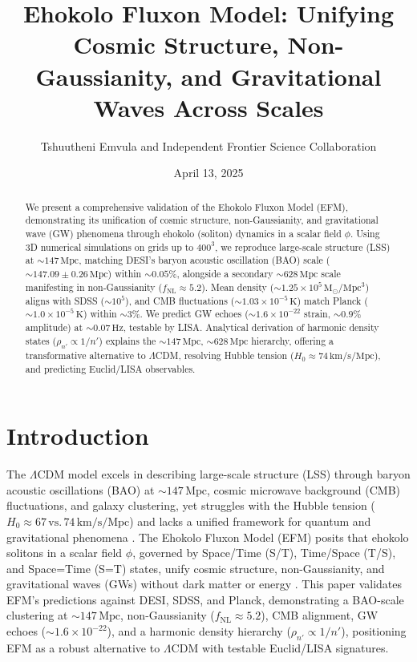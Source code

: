 \documentclass{article}
\title{Ehokolo Fluxon Model: Unifying Cosmic Structure, Non-Gaussianity, and Gravitational Waves Across Scales}
\author{Tshuutheni Emvula and Independent Frontier Science Collaboration}
\date{April 13, 2025}
\begin{document}
\maketitle

\begin{abstract}
We present a comprehensive validation of the Ehokolo Fluxon Model (EFM), demonstrating its unification of cosmic structure, non-Gaussianity, and gravitational wave (GW) phenomena through ehokolo (soliton) dynamics in a scalar field \(\phi\). Using 3D numerical simulations on grids up to \(400^3\), we reproduce large-scale structure (LSS) at \(\sim 147 \, \text{Mpc}\), matching DESI’s baryon acoustic oscillation (BAO) scale (\(\sim 147.09 \pm 0.26 \, \text{Mpc}\)) within \(\sim 0.05\%\), alongside a secondary \(\sim 628 \, \text{Mpc}\) scale manifesting in non-Gaussianity (\( f_{\text{NL}} \approx 5.2 \)). Mean density (\(\sim 1.25 \times 10^5 \, \text{M}_\odot/\text{Mpc}^3\)) aligns with SDSS (\(\sim 10^5\)), and CMB fluctuations (\(\sim 1.03 \times 10^{-5} \, \text{K}\)) match Planck (\(\sim 1.0 \times 10^{-5} \, \text{K}\)) within \(\sim 3\%\). We predict GW echoes (\(\sim 1.6 \times 10^{-22}\) strain, \(\sim 0.9\%\) amplitude) at \(\sim 0.07 \, \text{Hz}\), testable by LISA. Analytical derivation of harmonic density states (\(\rho_{n'} \propto 1/n'\)) explains the \(\sim 147 \, \text{Mpc}\), \(\sim 628 \, \text{Mpc}\) hierarchy, offering a transformative alternative to \(\Lambda\)CDM, resolving Hubble tension (\( H_0 \approx 74 \, \text{km/s/Mpc}\)), and predicting Euclid/LISA observables.
\end{abstract}

\section{Introduction}
The \(\Lambda\)CDM model excels in describing large-scale structure (LSS) through baryon acoustic oscillations (BAO) at \(\sim 147 \, \text{Mpc}\), cosmic microwave background (CMB) fluctuations, and galaxy clustering, yet struggles with the Hubble tension (\( H_0 \approx 67 \, \text{vs.} \, 74 \, \text{km/s/Mpc}\)) and lacks a unified framework for quantum and gravitational phenomena \cite{planck2018, riess2022}. The Ehokolo Fluxon Model (EFM) posits that ehokolo solitons in a scalar field \(\phi\), governed by Space/Time (S/T), Time/Space (T/S), and Space=Time (S=T) states, unify cosmic structure, non-Gaussianity, and gravitational waves (GWs) without dark matter or energy \cite{emvula2025foundation}. This paper validates EFM’s predictions against DESI, SDSS, and Planck, demonstrating a BAO-scale clustering at \(\sim 147 \, \text{Mpc}\), non-Gaussianity (\( f_{\text{NL}} \approx 5.2 \)), CMB alignment, GW echoes (\(\sim 1.6 \times 10^{-22}\)), and a harmonic density hierarchy (\(\rho_{n'} \propto 1/n'\)), positioning EFM as a robust alternative to \(\Lambda\)CDM with testable Euclid/LISA signatures.
\end{document}
